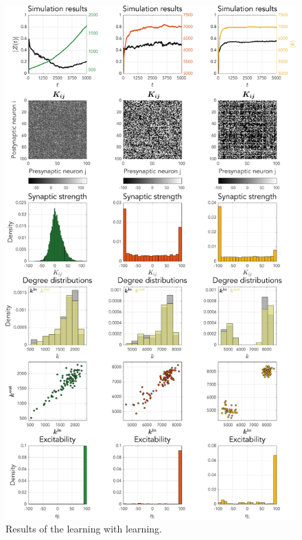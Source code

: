 \begin{figure}[H]
\centering
\includegraphics[height = \textheight]{../Figures/Learning/STDPandIP.pdf}
\caption{Results of the \STDP learning with \IP learning.}
\label{fig:STDPandIP}
\end{figure}


